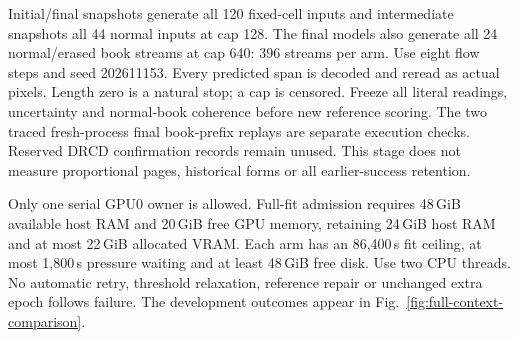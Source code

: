 Initial/final snapshots generate all 120 fixed-cell inputs and intermediate
snapshots all 44 normal inputs at cap 128. The final models also generate all
24 normal/erased book streams at cap 640: 396 streams per arm. Use eight flow
steps and seed 202611153. Every predicted span is decoded and reread as actual
pixels. Length zero is a natural stop; a cap is censored. Freeze all literal
readings, uncertainty and normal-book coherence before new reference scoring.
The two traced fresh-process final book-prefix replays are separate execution
checks. Reserved DRCD confirmation records remain unused. This stage does not
measure proportional pages, historical forms or all earlier-success retention.

Only one serial GPU0 owner is allowed. Full-fit admission requires 48\,GiB
available host RAM and 20\,GiB free GPU memory, retaining 24\,GiB host RAM and
at most 22\,GiB allocated VRAM. Each arm has an 86,400\,s fit ceiling, at most
1,800\,s pressure waiting and at least 48\,GiB free disk. Use two CPU threads.
No automatic retry, threshold relaxation, reference repair or unchanged extra
epoch follows failure. The development outcomes appear in Fig.~\ref{fig:full-context-comparison}.
